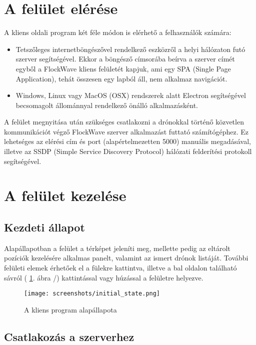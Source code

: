 \section{A felület elérése}

A kliens oldali program két féle módon is elérhető a felhasználók számára:
\begin{itemize}
  \item Tetszőleges internetböngészővel rendelkező eszközről a helyi hálózaton
  futó szerver segítségével. Ekkor a böngésző címsorába beírva a szerver címét
  egyből a FlockWave kliens felületét kapjuk, ami egy SPA (Single Page
  Application), tehát összesen egy lapból áll, nem alkalmaz navigációt.
  \item Windows, Linux vagy MacOS (OSX) rendszerek alatt Electron segítségével
  becsomagolt állománnyal rendelkező önálló alkalmazásként.
\end{itemize}

A felület megnyitása után szükséges csatlakozni a drónokkal történő közvetlen
kommunikációt végző FlockWave szerver alkalmazást futtató számítógéphez. Ez
lehetséges az elérési cím és port (alapértelmezetten 5000) manuális megadásával,
illetve az SSDP (Simple Service Discovery Protocol) hálózati felderítési
protokoll segítségével.

\section{A felület kezelése}

\subsection{Kezdeti állapot}

Alapállapotban a felület a térképet jeleníti meg, mellette pedig az eltárolt
pozíciók kezelésére alkalmas panelt, valamint az ismert drónok listáját. További
felületi elemek érhetőek el a fülekre kattintva, illetve a bal oldalon található
sávról ( \ref{fig:initial_state}. ábra /) kattintással vagy húzással
a felületre helyezve.

\begin{figure}[H]
  \center
  \texttt{[image: screenshots/initial\_state.png]}
  \caption{A kliens program alapállapota}
  \label{fig:initial_state}
\end{figure}


\subsection{Csatlakozás a szerverhez}

